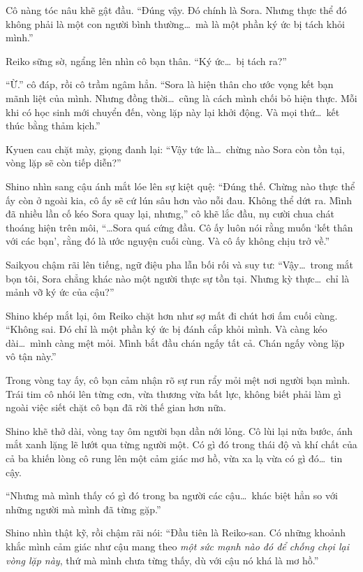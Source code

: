 \documentclass[../main.tex]{subfiles}
\begin{document}
Cô nàng tóc nâu khẽ gật đầu. ``Đúng vậy. Đó chính là Sora. Nhưng thực thể đó không phải là một con người bình thường\dots\ mà là một phần ký ức bị tách khỏi mình.''

Reiko sững sờ, ngẩng lên nhìn cô bạn thân. ``Ký ức\dots\ bị tách ra?''

``Ừ.'' cô đáp, rồi cô trầm ngâm hẳn. ``Sora là hiện thân cho ước vọng kết bạn mãnh liệt của mình. Nhưng đồng thời\dots\ cũng là cách mình chối bỏ hiện thực. Mỗi khi có học sinh mới chuyển đến, vòng lặp này lại khởi động. Và mọi thứ\dots\ kết thúc bằng thảm kịch.''

Kyuen cau chặt mày, giọng đanh lại: ``Vậy tức là\dots\ chừng nào Sora còn tồn tại, vòng lặp sẽ còn tiếp diễn?''

Shino nhìn sang cậu ánh mắt lóe lên sự kiệt quệ: ``Đúng thế. Chừng nào thực thể ấy còn ở ngoài kia, cô ấy sẽ cứ lún sâu hơn vào nỗi đau. Không thể dứt ra. Mình đã nhiều lần cố kéo Sora quay lại, nhưng,'' cô khẽ lắc đầu, nụ cười chua chát thoáng hiện trên môi, ``\dots Sora quá cứng đầu. Cô ấy luôn nói rằng muốn `kết thân với các bạn', rằng đó là ước nguyện cuối cùng. Và cô ấy không chịu trở về.''

Saikyou chậm rãi lên tiếng, ngữ điệu pha lẫn bối rối và suy tư: ``Vậy\dots\ trong mắt bọn tôi, Sora chẳng khác nào một người thực sự tồn tại. Nhưng kỳ thực\dots\ chỉ là mảnh vỡ ký ức của cậu?''

Shino khép mắt lại, ôm Reiko chặt hơn như sợ mất đi chút hơi ấm cuối cùng. ``Không sai. Đó chỉ là một phần ký ức bị đánh cắp khỏi mình. Và càng kéo dài\dots\ mình càng mệt mỏi. Mình bắt đầu chán ngấy tất cả. Chán ngấy vòng lặp vô tận này.''

Trong vòng tay ấy, cô bạn cảm nhận rõ sự run rẩy mỏi mệt nơi người bạn mình. Trái tim cô nhói lên từng cơn, vừa thương vừa bất lực, không biết phải làm gì ngoài việc siết chặt cô bạn đã rời thế gian hơn nữa.

Shino khẽ thở dài, vòng tay ôm người bạn dần nới lỏng. Cô lùi lại nửa bước, ánh mắt xanh lặng lẽ lướt qua từng người một. Có gì đó trong thái độ và khí chất của cả ba khiến lòng cô rung lên một cảm giác mơ hồ, vừa xa lạ vừa có gì đó\dots\ tin cậy.

``Nhưng mà mình thấy có gì đó trong ba người các cậu\dots\ khác biệt hẳn so với những người mà mình đã từng gặp.''

Shino nhìn thật kỹ, rồi chậm rãi nói: ``Đầu tiên là Reiko-san. Có những khoảnh khắc mình cảm giác như cậu mang theo \emph{một sức mạnh nào đó để chống chọi lại vòng lặp này}, thứ mà mình chưa từng thấy, dù với cậu nó khá là mơ hồ.''
\end{document}
